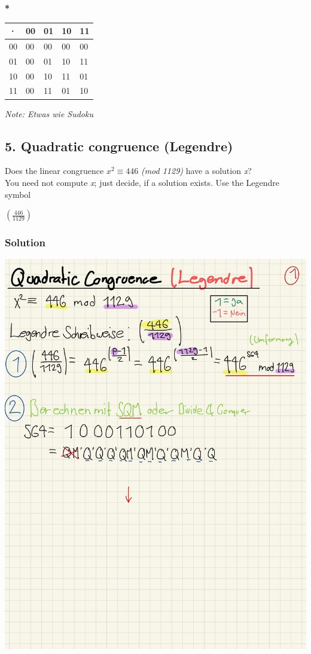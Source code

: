 \documentclass[11pt]{article}
\begin{document}
\textbf{*}

\begin{longtable}[]{@{}lllll@{}}
\toprule
· & 00 & 01 & 10 & 11\tabularnewline
\midrule
\endhead
00 & 00 & 00 & 00 & 00\tabularnewline
01 & 00 & 01 & 10 & 11\tabularnewline
10 & 00 & 10 & 11 & 01\tabularnewline
11 & 00 & 11 & 01 & 10\tabularnewline
\bottomrule
\end{longtable}

\emph{Note: Etwas wie Sudoku}

    \hypertarget{quadratic-congruence-legendre}{%
\subsection{5. Quadratic congruence
(Legendre)}\label{quadratic-congruence-legendre}}

Does the linear congruence \(x^{2} \equiv 446\) \emph{(mod 1129)} have a
solution \emph{x}?\\
You need not compute \emph{x}; just decide, if a solution exists. Use
the Legendre symbol

\((\frac{446}{1129})\)

\hypertarget{solution}{%
\subsubsection{Solution}\label{solution}}

\includegraphics[scale=0.75]{img/legendre1.jpg}
\end{document}
